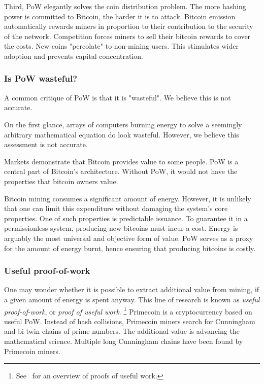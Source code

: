 Third, PoW elegantly solves the coin distribution problem.
The more hashing power is committed to Bitcoin, the harder it is to attack.
Bitcoin emission automatically rewards miners in proportion to their contribution to the security of the network.
Competition forces miners to sell their bitcoin rewards to cover the costs.
New coins "percolate" to non-mining users.
This stimulates wider adoption and prevents capital concentration.


\subsubsection*{Is PoW wasteful?}

A common critique of PoW is that it is "wasteful".
We believe this is not accurate.

On the first glance, arrays of computers burning energy to solve a seemingly arbitrary mathematical equation do look wasteful.
However, we believe this assessment is not accurate.

Markets demonstrate that Bitcoin provides value to some people.
PoW is a central part of Bitcoin's architecture.
Without PoW, it would not have the properties that bitcoin owners value.

Bitcoin mining consumes a significant amount of energy.
However, it is unlikely that one can limit this expenditure without damaging the system's core properties.
One of such properties is predictable issuance.
To guarantee it in a permissionless system, producing new bitcoins must incur a cost.
Energy is arguably the most universal and objective form of value.
PoW serves as a proxy for the amount of energy burnt, hence ensuring that producing bitcoins is costly.


\subsubsection*{Useful proof-of-work}

One may wonder whether it is possible to extract additional value from mining, if a given amount of energy is spent anyway.
This line of research is known as \textit{useful proof-of-work}, or \textit{proof of useful work}.
\footnote{See~\cite{Ball2017} for an overview of proofs of useful work.}
Primecoin is a cryptocurrency based on useful PoW.
Instead of hash collisions, Primecoin miners search for Cunningham and bi-twin chains of prime numbers.
The additional value is advancing the mathematical science.
Multiple long Cunningham chains have been found by Primecoin miners.

